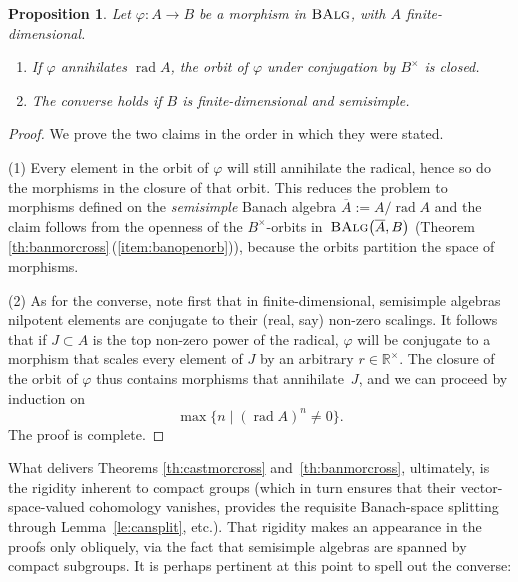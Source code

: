 \documentclass[10pt,a4paper]{amsart}
\numberwithin{equation}{section}
\newtheorem{Proposition}[Theorem]{Proposition}
 { \theoremstyle{definition}
\newtheorem{Definition}[Theorem]{Definition}
\newtheorem{Note}[Theorem]{Note}
\newtheorem{Notation}[Theorem]{Notation}
\newtheorem{Example}[Theorem]{Example}
\newtheorem{Examples}[Theorem]{Examples}
\newtheorem{Remark}[Theorem]{Remark}
\newtheorem{Remarks}[Theorem]{Remarks}
\newtheorem{Convention}[Theorem]{Convention}
}
\newcommand\bR{{\mathbb R}}
\newcommand{\cat}[1]{\text{\sc #1}}
\begin{document}
\begin{Proposition}\label{pr:clorb}
 Let $\varphi\colon A\to B$ be a morphism in $\cat{BAlg}$, with $A$ finite-dimensional.
 \begin{enumerate}[$(1)$]\itemsep=0pt
 \item If $\varphi$ annihilates $\operatorname{rad}A$, the orbit of $\varphi$ under conjugation by $B^{\times}$ is closed.
 \item The converse holds if $B$ is finite-dimensional and semisimple.
 \end{enumerate}
\end{Proposition}
\begin{proof}
 We prove the two claims in the order in which they were stated.

(1) Every element in the orbit of $\varphi$ will still annihilate the radical, hence so do the morphisms in the closure of that orbit. This reduces the problem to morphisms defined on the {\it semisimple} Banach algebra $\overline{A}:=A/\operatorname{rad}A$ and the claim follows from the openness of the $B^{\times}$-orbits in~$\cat{BAlg}\big(\overline{A},B\big)$ (Theorem \ref{th:banmorcross}\,(\ref{item:banopenorb})), because the orbits partition the space of morphisms.

(2) As for the converse, note first that in finite-dimensional, semisimple algebras nilpotent elements are conjugate to their (real, say) non-zero scalings. It follows that if $J\subset A$ is the top non-zero power of the radical, $\varphi$ will be conjugate to a morphism that scales every element of $J$ by an arbitrary $r\in \bR^{\times}$. The closure of the orbit of $\varphi$ thus contains morphisms that annihilate~$J$, and we can proceed by induction on
 \begin{equation*}
 \max\{n\mid(\operatorname{rad}A)^n\ne 0\}.
 \end{equation*}
 The proof is complete.
\end{proof}

What delivers Theorems \ref{th:castmorcross} and~\ref{th:banmorcross}, ultimately, is the rigidity inherent to compact groups (which in turn ensures that their vector-space-valued cohomology vanishes, provides the requisite Banach-space splitting through Lemma~\ref{le:cansplit}, etc.). That rigidity makes an appearance in the proofs only obliquely, via the fact that semisimple algebras are spanned by compact subgroups. It is perhaps pertinent at this point to spell out the converse:
\end{document}

